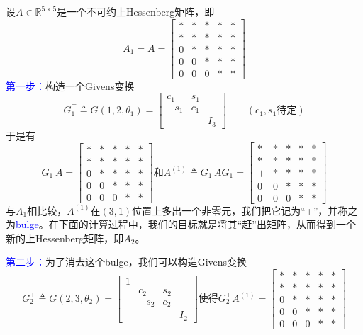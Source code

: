 \documentclass[12pt,a4paper]{article}
\begin{document}
设$A \in \mathbb{R}^{5 \times 5}$是一个不可约上Hessenberg矩阵，即$$
A_{1}=A=\left[\begin{array}{ccccc}{*} & {*} & {*}& {*}& {*} \\ {*} & {*} & {*}& {*}& {*} \\ {0} & {*} & {*}& {*}& {*} \\ {0} & {0} & {*} & {*}& {*} \\ {0} & {0} & {0} & {*}& {*}\end{array}\right]
$$
\textcolor{blue}{第一步：}\quad 构造一个Givens变换
$$
G_{1}^{\top} \triangleq G\left(1,2, \theta_{1}\right)=\left[\begin{array}{ccc}{c_{1}} & {s_{1}}& \\ {-s_{1}} & {c_{1}} &\\ {} && {I_{3}}\end{array}\right]
\qquad (c_1,s_1\text{待定})
$$
于是有$$
G_{1}^{\top} A=\left[\begin{array}{ccccc}{*}  & {*} & {*}& {*}& {*}\\ {*} & {*} & {*} & {*}& {*}\\ {0} & {*} & {*}& {*}& {*} \\ {0} & {0} & {*} & {*}& {*}\\ {0} & {0} & {0} & { *}& {*}\end{array}\right] \text{和}A^{(1)} \triangleq G_{1}^{\top} A G_{1}=\left[\begin{array}{ccccc}{*}  & {*} & {*}& {*} & {*} \\ {*}  & {*} & {*}& {*} & {*} \\ {+} & {*} & {*}  & {*} & {*}\\ {0} & {0} & {*} & {*}  & {*}\\ {0} & {0} & {0} & {*} & {*}\end{array}\right]
$$
与$A_1$相比较，$A^{(1)}$在$(3,1)$位置上多出一个非零元，我们把它记为“+”，并称之为\textcolor{blue}{bulge}。在下面的计算过程中，我们的目标就是将其“赶”出矩阵，从而得到一个新的上Hessenberg矩阵，即$A_2$。

\textcolor{blue}{第二步：}\quad 为了消去这个bulge，我们可以构造Givens变换$$
G_{2}^{\top} \triangleq G\left(2,3, \theta_{2}\right)=\left[\begin{array}{cccc}{1} & {} & {} &\\ {} & {c_{2}} & {s_{2}}& \\ {} & {-s_{2}} & {c_{2}} &\\ {} & {} && {I_{2}}\end{array}\right]
\text{使得}G_{2}^{\top} A^{(1)}=\left[\begin{array}{ccccc}{*} & {*} & {*} & {*}& {*}\\ {*} & {*} & {*} & {*} & {*}\\ {0} & {*} & {*} & {*}& {*} \\ {0} & {0} & {*} & {*}& {*} \\ {0} & {0} & {0} & {*}& {*}\end{array}\right]$$
\end{document}
